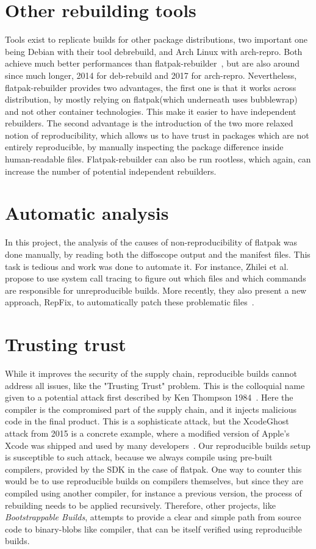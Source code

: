 \documentclass[a4paper,11pt,oneside]{report}
\theoremstyle{definition}
\newcommand{\sysname}{flatpak-rebuilder\xspace}
\newcommand{\Sysname}{Flatpak-rebuilder\xspace}
\newcommand{\rb}{reproducible builds\xspace}
\newcommand{\fp}{flatpak\xspace}
\begin{document}
\section{Other rebuilding tools}
Tools exist to replicate builds for other package distributions, two important
one being Debian with their tool debrebuild, and Arch Linux with arch-repro.
Both achieve much better performances than \sysname~\cite{debian:repro,
arch-rebuilderd}, but are also around since much longer, 2014 for deb-rebuild
and 2017 for arch-repro. Nevertheless, \sysname provides two advantages, the
first one is that it works across distribution, by mostly relying on \fp (which
underneath uses bubblewrap) and not other container technologies. This make it
easier to have independent rebuilders. The second advantage is the introduction
of the two more relaxed notion of reproducibility, which allows us to have
trust in packages which are not entirely reproducible, by manually inspecting
the package difference inside human-readable files. \Sysname can also be run
rootless, which again, can increase the number of potential independent
rebuilders.

\section{Automatic analysis}
In this project, the analysis of the causes of non-reproducibility of \fp was
done manually, by reading both the diffoscope output and the manifest files.
This task is tedious and work was done to automate it. For instance, Zhilei et
al.~\cite{DBLP:journals/corr/abs-1803-06766} propose to use system call tracing
to figure out which files and which commands are responsible for unreproducible
builds. More recently, they also present a new approach, RepFix, to
automatically patch these problematic files~\cite{}.

\section{Trusting trust}
While it improves the security of the supply chain, \rb cannot address all
issues, like the "Trusting Trust" problem. This is the colloquial name given to
a potential attack first described by Ken Thompson 1984~\cite{thompson1984}.
Here the compiler is the compromised part of the supply chain, and it injects
malicious code in the final product. This is a sophisticate attack, but the
XcodeGhost attack from 2015 is a concrete example, where a modified version of
Apple's Xcode was shipped and used by many developers~\cite{enwiki:1054394297}.
Our \rb setup is susceptible to such attack, because we always compile using
pre-built compilers, provided by the SDK in the case of \fp. One way to counter
this would be to use \rb on compilers themselves, but since they are compiled
using another compiler, for instance a previous version, the process of
rebuilding needs to be applied recursively. Therefore, other projects, like
\emph{Bootstrappable Builds}, attempts to provide a clear and simple path from
source code to binary-blobs like compiler, that can be itself verified using
\rb.
\end{document}
